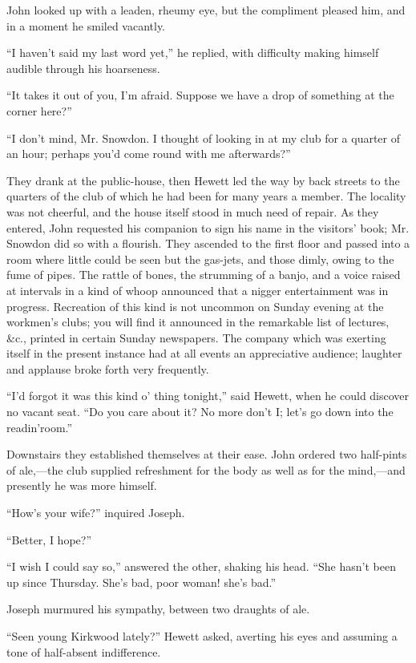 John looked up with a leaden, rheumy eye, but the compliment pleased
him, and in a moment he smiled vacantly.

``I haven't said my last word yet,'' he replied, with difficulty making
himself audible through his hoarseness.

``It takes it out of you, I'm afraid. Suppose we have a drop of
something at the corner here?''

``I don't mind, Mr. Snowdon. I thought {\protect\hypertarget{154}{}{}}of
looking in at my club for a quarter of an hour; perhaps you'd come round
with me afterwards?''

They drank at the public-house, then Hewett led the way by back streets
to the quarters of the club of which he had been for many years a
member. The locality was not cheerful, and the house itself stood in
much need of repair. As they entered, John requested his companion to
sign his name in the visitors' book; Mr. Snowdon did so with a flourish.
They ascended to the first floor and passed into a room where little
could be seen but the gas-jets, and those dimly, owing to the fume of
pipes. The rattle of bones, the strumming of a banjo, and a voice raised
at intervals in a kind of whoop announced that a nigger entertainment
was in progress. Recreation of this kind is not uncommon on Sunday
evening at the workmen's clubs; you will find it announced in the
remarkable list of lectures, \&c., printed in certain Sunday newspapers.
The company which was exerting itself in the present instance had at all
{\protect\hypertarget{155}{}{}}events an appreciative audience; laughter
and applause broke forth very frequently.

``I'd forgot it was this kind o' thing tonight,'' said Hewett, when he
could discover no vacant seat. ``Do you care about it? No more don't I;
let's go down into the readin'room.''

Downstairs they established themselves at their ease. John ordered two
half-pints of ale,---the club supplied refreshment for the body as well
as for the mind,---and presently he was more himself.

``How's your wife?'' inquired Joseph.

``Better, I hope?''

``I wish I could say so,'' answered the other, shaking his head. ``She
hasn't been up since Thursday. She's bad, poor woman! she's bad.''

Joseph murmured his sympathy, between two draughts of ale.

``Seen young Kirkwood lately?'' Hewett asked, averting his eyes and
assuming a tone of half-absent indifference.

